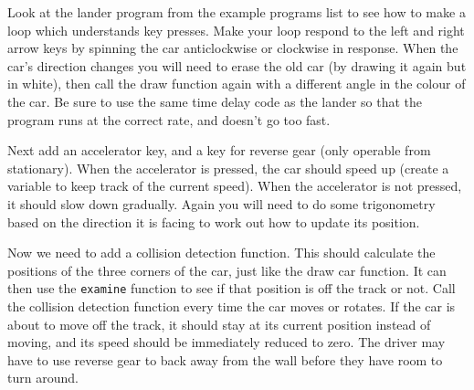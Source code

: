 \documentclass[12pt,a4paper,twoside]{article}
\renewcommand{\_}{\texttt{\symbol{95}}}
\begin{document}
Look at the lander program from the example programs list to see how
to make a loop which understands key presses. Make your loop respond
to the left and right arrow keys by spinning the car anticlockwise
or clockwise in response. When the car's direction changes you will
need to erase the old car (by drawing it again but in white), then
call the draw function again with a different angle in the colour of the car.
Be sure to use
the same time delay code as the lander so that the program runs at
the correct rate, and doesn't go too fast.

Next add an accelerator key, and a key for reverse gear (only operable
from stationary). When the accelerator is pressed, the car should
speed up (create a variable to keep track of the current speed).
When the accelerator is not pressed, it should slow down gradually.
Again you will need to do some trigonometry based on the direction it
is facing to work out how to update its position.

Now we need to add a collision detection function. This should calculate
the positions of the three corners of the car, just like the draw car
function. It can then use the \verb^examine^ function to see if that
position is off the track or not. Call the collision detection function
every time the car moves or rotates. If the car is about to move off the
track, it should stay at its current position instead of moving, and
its speed should be immediately reduced to zero. The driver may
have to use reverse gear to back away from the wall before they have
room to turn around.
\end{document}
